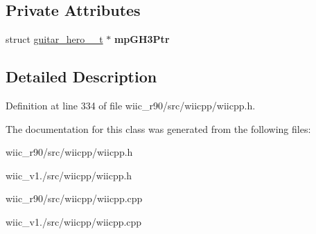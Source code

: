 \subsection*{Private Attributes}
\begin{DoxyCompactItemize}
\item 
\hypertarget{class_c_guitar_hero3_ae77e1ad65f81ca7b28a350d3695f65fa}{struct \hyperlink{structguitar__hero__3__t}{guitar\-\_\-hero\-\_\-\_\-t} $\ast$ {\bfseries mp\-G\-H3\-Ptr}}\label{class_c_guitar_hero3_ae77e1ad65f81ca7b28a350d3695f65fa}

\end{DoxyCompactItemize}


\subsection{Detailed Description}


Definition at line 334 of file wiic\-\_\-r90/src/wiicpp/wiicpp.\-h.



The documentation for this class was generated from the following files\-:\begin{DoxyCompactItemize}
\item 
wiic\-\_\-r90/src/wiicpp/wiicpp.\-h\item 
wiic\-\_\-v1./src/wiicpp/wiicpp.\-h\item 
wiic\-\_\-r90/src/wiicpp/wiicpp.\-cpp\item 
wiic\-\_\-v1./src/wiicpp/wiicpp.\-cpp\end{DoxyCompactItemize}
